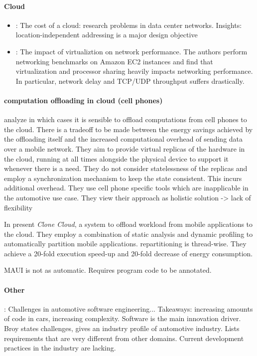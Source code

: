 \paragraph{Cloud}

\begin{itemize}
	\item \cite{greenberg2008cost}: The cost of a cloud: research problems in data center networks. Insights: location-independent addressing is a major design objective
	\item \cite{wang2010impact}: The impact of virtualiztion on network performance. The authors perform networking benchmarks on Amazon EC2 instances and find that virtualization and processor sharing heavily impacts networking performance. In particular, network delay and TCP/UDP throughput suffers drastically.
\end{itemize}

\paragraph{computation offloading in cloud (cell phones)}
\citeauthor*{barbera2013offload} \cite{barbera2013offload} analyze in which cases it is sensible to offload computations from cell phones to the cloud. There is a tradeoff to be made between the energy savings achieved by the offloading itself and the increased computational overhead of sending data over a mobile network. They aim to provide virtual replicas of the hardware in the cloud, running at all times alongside the physical device to support it whenever there is a need. They do not consider statelessness of the replicas and employ a synchronization mechanism to keep the state consistent. This incurs additional overhead. They use cell phone specific tools which are inapplicable in the automotive use case. They view their approach as holistic solution -> lack of flexibility

In \cite{chun2011clonecloud} \citeauthor*{barbera2013offload} present \emph{Clone Cloud}, a system to offload workload from mobile applications to the cloud. They employ a combination of static analysis and dynamic profiling to automatically partition mobile applications. repartitioning is thread-wise. They achieve a 20-fold execution speed-up and 20-fold decrease of energy consumption.

MAUI is not as automatic. Requires program code to be annotated.

\paragraph{Other}
\citeauthor*{broy2006challenges} \cite{broy2006challenges}: Challenges in automotive software engineering... Takeaways: increasing amounts of code in cars, increasing complexity. Software is the main innovation driver. Broy states challenges, gives an industry profile of automotive industry. Lists requirements that are very different from other domains. Current development practices in the industry are lacking.
